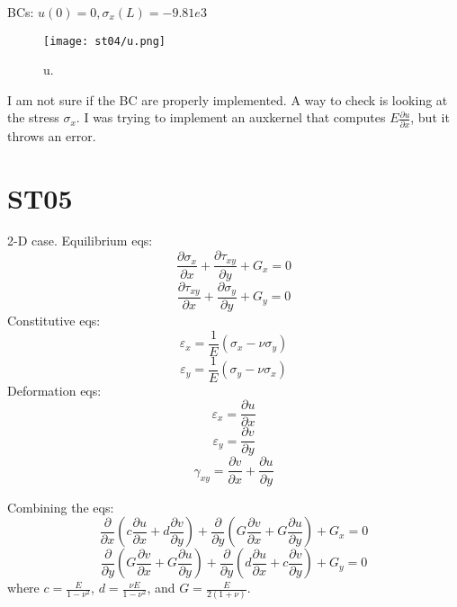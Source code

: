 \documentclass[11pt,letterpaper]{article}
\begin{document}
BCs: $u(0)=0, \sigma_x(L)=-9.81e3$

\begin{figure}[H]
	\centering
	\texttt{[image: st04/u.png]}
	\hfill
	\caption{u.}
	\label{fig:st04}
\end{figure}

I am not sure if the BC are properly implemented. A way to check is looking at the stress $\sigma_x$.
I was trying to implement an auxkernel that computes $E \frac{\partial u}{\partial x}$, but it throws an error.

\section{ST05}

2-D case.
Equilibrium eqs:
\begin{equation}
\frac{\partial \sigma_x}{\partial x} + \frac{\partial \tau_{xy}}{\partial y} + G_x = 0
\end{equation}
\begin{equation}
\frac{\partial \tau_{xy}}{\partial x} + \frac{\partial \sigma_y}{\partial y} + G_y = 0
\end{equation}
Constitutive eqs:
\begin{equation}
\varepsilon_x = \frac{1}{E} (\sigma_x - \nu \sigma_y)
\end{equation}
\begin{equation}
\varepsilon_y = \frac{1}{E} (\sigma_y - \nu \sigma_x)
\end{equation}
Deformation eqs:
\begin{equation}
\varepsilon_x = \frac{\partial u}{\partial x}
\end{equation}
\begin{equation}
\varepsilon_y = \frac{\partial v}{\partial y}
\end{equation}
\begin{equation}
\gamma_{xy} = \frac{\partial v}{\partial x} + \frac{\partial u}{\partial y}
\end{equation}

Combining the eqs:
\begin{equation}
\frac{\partial}{\partial x}(c \frac{\partial u}{\partial x} + d \frac{\partial v}{\partial y}) + \frac{\partial}{\partial y}(G \frac{\partial v}{\partial x} + G \frac{\partial u}{\partial y}) + G_x = 0
\end{equation}
\begin{equation}
\frac{\partial}{\partial y}(G \frac{\partial v}{\partial x} + G \frac{\partial u}{\partial y}) + \frac{\partial}{\partial y}(d \frac{\partial u}{\partial x} + c \frac{\partial v}{\partial y}) + G_y = 0
\end{equation}
where $c = \frac{E}{1-\nu^2}$, $d = \frac{\nu E}{1-\nu^2}$, and $G = \frac{E}{2(1+\nu)}$.
\end{document}
